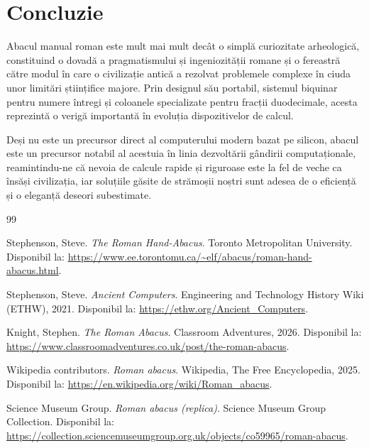 \documentclass[12pt, a4paper]{article}
\begin{document}
\section*{Concluzie}
\quad Abacul manual roman este mult mai mult decât o simplă curiozitate arheologică, constituind o dovadă a pragmatismului și ingeniozității romane și o fereastră către modul în care o civilizație antică a rezolvat problemele complexe în ciuda unor limitări științifice majore. Prin designul său portabil, sistemul biquinar pentru numere întregi și coloanele specializate pentru fracții duodecimale, acesta reprezintă o verigă importantă în evoluția dispozitivelor de calcul.

Deși nu este un precursor direct al computerului modern bazat pe silicon, abacul este un precursor notabil al acestuia în linia dezvoltării gândirii computaționale, reamintindu-ne că nevoia de calcule rapide și riguroase este la fel de veche ca însăși civilizația, iar soluțiile găsite de strămoșii noștri sunt adesea de o eficiență și o eleganță deseori subestimate.

\newpage
\begin{thebibliography}{99}

Stephenson, Steve. \textit{The Roman Hand-Abacus}. Toronto Metropolitan University. Disponibil la: \url{https://www.ee.torontomu.ca/~elf/abacus/roman-hand-abacus.html}.

Stephenson, Steve. \textit{Ancient Computers}. Engineering and Technology History Wiki (ETHW), 2021. Disponibil la: \url{https://ethw.org/Ancient_Computers}.

Knight, Stephen. \textit{The Roman Abacus}. Classroom Adventures, 2026. Disponibil la: \url{https://www.classroomadventures.co.uk/post/the-roman-abacus}.

Wikipedia contributors. \textit{Roman abacus}. Wikipedia, The Free Encyclopedia, 2025. Disponibil la: \url{https://en.wikipedia.org/wiki/Roman_abacus}.

Science Museum Group. \textit{Roman abacus (replica)}. Science Museum Group Collection. Disponibil la: \url{https://collection.sciencemuseumgroup.org.uk/objects/co59965/roman-abacus}.

\end{thebibliography}
\end{document}
